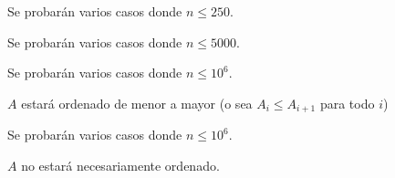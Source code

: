 \documentclass{oci}
\begin{document}
\begin{scoreDescription}
  Se probarán varios casos donde $n \le 250$.
 
  Se probarán varios casos donde $n \le 5000$.
 
  Se probarán varios casos donde $n \le 10^6$.
  
  $A$ estará ordenado de menor a mayor (o sea $A_i \le A_{i+1}$ para todo $i$)
 
  Se probarán varios casos donde $n \le 10^6$.
  
  $A$ no estará necesariamente ordenado.
\end{scoreDescription}

\begin{sampleDescription}
\end{sampleDescription}
\end{document}
